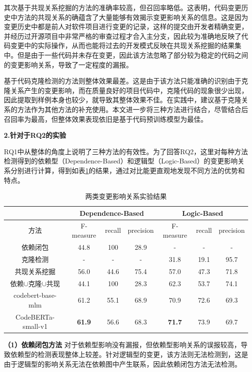 其次基于共现关系挖掘的方法的准确率较高，但召回率略低。这表明，代码变更历史中方法的共现关系的确蕴含了大量能够有效揭示变更影响关系的信息。这是因为变更历史中都是前人对软件项目进行变更的记录，这样的提交由开发者精确变更，并经历过开源项目中非常严格的审查过程才合入主分支，因此较为准确地反映了代码变更中的实际操作，从而也能将过去的开发模式反映在共现关系挖掘的结果集中。但是由于一些代码并未存在变更，因此该方法忽略了部分较为稳定的代码之间的变更影响关系，导致了一定程度的漏报。

基于代码克隆检测的方法则整体效果最差。这是由于该方法只能准确的识别由于克隆关系产生的变更影响，而在质量良好的项目代码中，克隆代码的现象很少出现，因此提取到样例本身也较少，就导致其整体效果不佳。在实践中，建议基于克隆关系的方法作为其他方法的补充使用。本文进一步将三种方法进行结合，尽管结合后召回率为最高，但整体效果表现依旧是基于代码预训练模型为最佳。

\textbf{2.针对于RQ2的实验}

RQ1中从整体的角度上说明了三种方法的有效性。为了回答RQ2，这里对每种方法检测得到的依赖型（Dependence-Based）和逻辑型（Logic-Based）的变更影响关系分别进行计算，得到如表\ref{1_两类变更影响关系实验结果}的结果，通过对比能更直观地发现不同方法的优势和特点。


\begin{table}[htbp]
\caption{两类变更影响关系实验结果}
\label{1_两类变更影响关系实验结果}
\vspace{0.5em}\centering\wuhao
\begin{tabular}{c|ccc|ccc}
\toprule
  & \multicolumn{3}{c|}{Dependence-Based} & \multicolumn{3}{c}{Logic-Based}  \\
\midrule
方法 & F-measure & recall & precision & F-measure & recall & precision  \\
\midrule
依赖闭包 &  44.8 & 100 & 28.9 & - & - & -  \\
克隆检测 &  - & - & - & 31.8 & 19.1 & 95.7 \\
共现关系挖掘 &  56.0 & 44.6 & 75.4 & 57.0 & 47.3 & 71.8 \\
依赖$\cup$克隆$\cup$共现 &  44.1 & 100 & 28.3 & 62.3 & 53.7 & 74.1 \\
codebert-base-mlm &   61.2 & 55.1 & 68.9 & 70.9 & 72.6 & 69.3 \\
CodeBERTa-small-v1 &   \textbf{61.9} & 56.6 & 68.3 & \textbf{71.7} & 73.9 & 69.7 \\
\bottomrule
\end{tabular}
\end{table}

\textbf{（1）依赖闭包方法} \hspace{2mm}对于依赖型影响没有漏报，但依赖型影响关系的误报较高，导致依赖型的检测表现整体上较差。针对逻辑型的变更，该方法则无法检测到，这是由于逻辑型的影响关系无法在依赖图中产生联系，因此依赖闭包方法无法检测。

